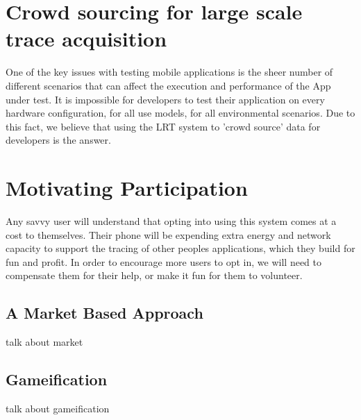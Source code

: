 
\section{Crowd sourcing for large scale trace acquisition}
One of the key issues with testing mobile applications is the sheer number
of different scenarios that can affect the execution and performance
of the App under test. It is impossible for developers to test their application
on every hardware configuration, for all use models, for all environmental scenarios.
Due to this fact, we believe that using the LRT system to 'crowd source' data for developers
is the answer.

\section{Motivating Participation}
Any savvy user will understand that opting into using this system comes at a cost to themselves.
Their phone will be expending extra energy and network capacity to support the tracing of 
other peoples applications, which they build for fun and profit.
In order to encourage more users to opt in, we will need to compensate them for their
help, or make it fun for them to volunteer.

\subsection{A Market Based Approach}
talk about market

\subsection{Gameification}
talk about gameification

